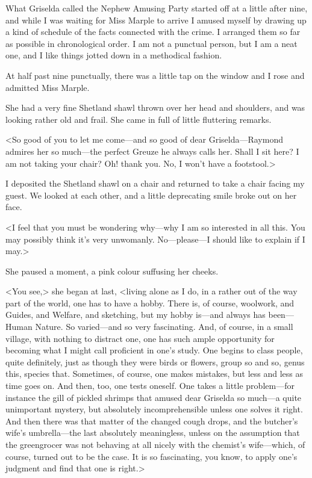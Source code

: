 What Griselda called the Nephew Amusing Party started off at a little after nine, and while I was waiting for Miss Marple to arrive I amused myself by drawing up a kind of schedule of the facts connected with the crime. I arranged them so far as possible in chronological order. I am not a punctual person, but I am a neat one, and I like things jotted down in a methodical fashion.

At half past nine punctually, there was a little tap on the window and I rose and admitted Miss Marple.

She had a very fine Shetland shawl thrown over her head and shoulders, and was looking rather old and frail. She came in full of little fluttering remarks.

<So good of you to let me come—and so good of dear Griselda—Raymond admires her so much—the perfect Greuze he always calls her. Shall I sit here? I am not taking your chair? Oh! thank you. No, I won't have a footstool.>

I deposited the Shetland shawl on a chair and returned to take a chair facing my guest. We looked at each other, and a little deprecating smile broke out on her face.

<I feel that you must be wondering why—why I am so interested in all this. You may possibly think it's very unwomanly. No—please—I should like to explain if I may.>

She paused a moment, a pink colour suffusing her cheeks.

<You see,> she began at last, <living alone as I do, in a rather out of the way part of the world, one has to have a hobby. There is, of course, woolwork, and Guides, and Welfare, and sketching, but my hobby is—and always has been—Human Nature. So varied—and so very fascinating. And, of course, in a small village, with nothing to distract one, one has such ample opportunity for becoming what I might call proficient in one's study. One begins to class people, quite definitely, just as though they were birds or flowers, group so and so, genus this, species that. Sometimes, of course, one makes mistakes, but less and less as time goes on. And then, too, one tests oneself. One takes a little problem—for instance the gill of pickled shrimps that amused dear Griselda so much—a quite unimportant mystery, but absolutely incomprehensible unless one solves it right. And then there was that matter of the changed cough drops, and the butcher's wife's umbrella—the last absolutely meaningless, unless on the assumption that the greengrocer was not behaving at all nicely with the chemist's wife—which, of course, turned out to be the case. It is so fascinating, you know, to apply one's judgment and find that one is right.>

